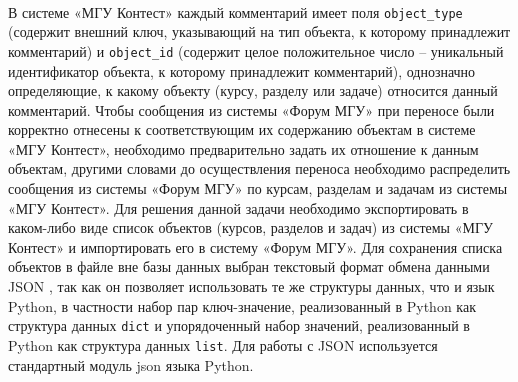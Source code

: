\documentclass[12pt, a4paper, oneside]{article}
\begin{document}
\paragraph{}
В системе «МГУ Контест» каждый комментарий имеет поля \texttt{object\_type} (содержит внешний ключ, указывающий на тип объекта, к которому принадлежит комментарий) и \texttt{object\_id} (содержит целое положительное число – уникальный идентификатор объекта, к которому принадлежит комментарий), однозначно определяющие, к какому объекту (курсу, разделу или задаче) относится данный комментарий. Чтобы сообщения из системы «Форум МГУ» при переносе были корректно отнесены к соответствующим их содержанию объектам в системе «МГУ Контест», необходимо предварительно задать их отношение к данным объектам, другими словами до осуществления переноса необходимо распределить сообщения из системы «Форум МГУ» по курсам, разделам и задачам из системы «МГУ Контест». Для решения данной задачи необходимо экспортировать в каком-либо виде список объектов (курсов, разделов и задач) из системы «МГУ Контест» и импортировать его в систему «Форум МГУ». Для сохранения списка объектов в файле вне базы данных выбран текстовый формат обмена данными JSON \cite{json}, так как он позволяет использовать те же структуры данных, что и язык Python, в частности набор пар ключ-значение, реализованный в Python как структура данных \texttt{dict} и упорядоченный набор значений, реализованный в Python как структура данных \texttt{list}. Для работы с JSON используется стандартный модуль json языка Python.
\end{document}
